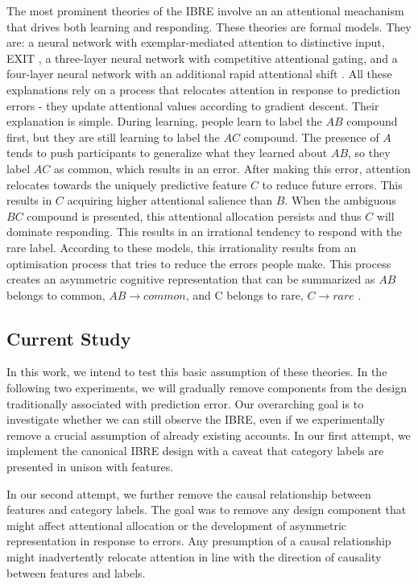 \documentclass[10pt,letterpaper]{article}
\begin{document}
The most prominent theories of the IBRE involve an an attentional meachanism that drives both learning and responding.
These theories are formal models.
They are: a neural network with exemplar-mediated attention to distinctive input, EXIT \cite{kruschke2001toward}, a three-layer neural network with competitive attentional gating, and a four-layer neural network with an additional rapid attentional shift \cite{paskewitz2020dissecting}.
All these explanations rely on a process that relocates attention in response to prediction errors - they update attentional values according to gradient descent.
Their explanation is simple.
During learning, people learn to label the $AB$ compound first, but they are still learning to label the $AC$ compound.
The presence of $A$ tends to push participants to generalize what they learned about $AB$, so they label $AC$ as common, which results in an error.
After making this error, attention relocates towards the uniquely predictive feature $C$ to reduce future errors.
This results in $C$ acquiring higher attentional salience than $B$.
When the ambiguous $BC$ compound is presented, this attentional allocation persists and thus $C$ will dominate responding.
This results in an irrational tendency to respond with the rare label.
According to these models, this irrationality results from an optimisation process that tries to reduce the errors people make.
This process creates an asymmetric cognitive representation that can be summarized as $AB$ belongs to common, $AB \to common$, and C belongs to rare, $C \to rare$ \cite{kruschke2001inverse}.

\subsection{Current Study}

In this work, we intend to test this basic assumption of these theories.
In the following two experiments, we will gradually remove components from the design traditionally associated with prediction error.
Our overarching goal is to investigate whether we can still observe the IBRE, even if we experimentally remove a crucial assumption of already existing accounts.
In our first attempt, we implement the canonical IBRE design with a caveat that category labels are presented in unison with features.

In our second attempt, we further remove the causal relationship between features and category labels.
The goal was to remove any design component that might affect attentional allocation or the development of asymmetric representation in response to errors.
Any presumption of a causal relationship might inadvertently relocate attention in line with the direction of causality between features and labels.
\end{document}

